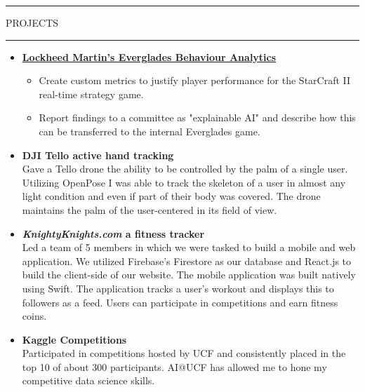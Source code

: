 \documentclass{article}
\newcommand{\makesection}[1]{\hrule\vskip1mm\uppercase{#1}\vskip1mm\hrule}
\begin{document}
\makesection{Projects}
\begin{itemize}[leftmargin=.35cm]
    \item \textbf{\href{https://github.com/ucfcs/Fall2020-Group-20}{Lockheed Martin's Everglades Behaviour Analytics}}
    \vspace*{-1.5mm}
    \begin{itemize}[leftmargin=.35cm]
        \item Create custom metrics to justify player performance for the StarCraft II real-time strategy game.
        \item Report findings to a committee as "explainable AI" and describe how this can be transferred to the internal Everglades game.
    \end{itemize}

    \item \textbf{DJI Tello active hand tracking} \\
    Gave a Tello drone the ability to be controlled by the palm of a single user. Utilizing OpenPose I was able to track the skeleton of a user in almost any light condition and even if part of their body was covered. The drone maintains the palm of the user-centered in its field of view.

    \item \textbf{\textit{KnightyKnights.com} a fitness tracker} \\
    Led a team of 5 members in which we were tasked to build a mobile and web application. We utilized Firebase's Firestore as our database and React.js to build the client-side of our website. The mobile application was built natively using Swift. The application tracks a user's workout and displays this to followers as a feed. Users can participate in competitions and earn fitness coins.

    \item \textbf{Kaggle Competitions} \\
    Participated in competitions hosted by UCF and consistently placed in the top 10 of about 300 participants. AI@UCF has allowed me to hone my competitive data science skills.
\end{itemize}
\end{document}
